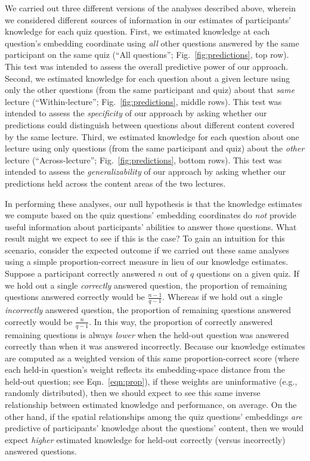 \documentclass[10pt]{article}
\begin{document}
We carried out three different versions of the analyses described above,
wherein we considered different sources of information in our estimates of
participants' knowledge for each quiz question. First, we estimated knowledge
at each question's embedding coordinate using \textit{all} other questions
answered by the same participant on the same quiz (``All questions'';
Fig.~\ref{fig:predictions}, top row). This test was intended to assess the
overall predictive power of our approach. Second, we estimated knowledge for
each question about a given lecture using only the other questions (from the
same participant and quiz) about that \textit{same} lecture
(``Within-lecture''; Fig.~\ref{fig:predictions}, middle rows). This test was
intended to assess the \textit{specificity} of our approach by asking whether
our predictions could distinguish between questions about different content
covered by the same lecture. Third, we estimated knowledge for each question
about one lecture using only questions (from the same participant and quiz)
about the \textit{other} lecture (``Across-lecture'';
Fig.~\ref{fig:predictions}, bottom rows). This test was intended to assess the
\textit{generalizability} of our approach by asking whether our predictions
held across the content areas of the two lectures.

In performing these analyses, our null hypothesis is that the knowledge
estimates we compute based on the quiz questions' embedding coordinates do
\textit{not} provide useful information about participants' abilities to answer
those questions. What result might we expect to see if this is the case? To
gain an intuition for this scenario, consider the expected outcome if we
carried out these same analyses using a simple proportion-correct measure in
lieu of our knowledge estimates. Suppose a participant correctly answered $n$
out of $q$ questions on a given quiz. If we hold out a single
\textit{correctly} answered question, the proportion of remaining questions
answered correctly would be $\frac{n - 1}{q - 1}$. Whereas if we hold out a
single \textit{incorrectly} answered question, the proportion of remaining
questions answered correctly would be $\frac{n}{q - 1}$. In this way, the
proportion of correctly answered remaining questions is always \textit{lower}
when the held-out question was answered correctly than when it was answered
incorrectly. Because our knowledge estimates are computed as a weighted version
of this same proportion-correct score (where each held-in question's weight
reflects its embedding-space distance from the held-out question; see
Eqn.~\ref{eqn:prop}), if these weights are uninformative (e.g., randomly
distributed), then we should expect to see this same inverse relationship
between estimated knowledge and performance, on average. On the other hand, if
the spatial relationships among the quiz questions' embeddings \textit{are}
predictive of participants' knowledge about the questions' content, then we
would expect \textit{higher} estimated knowledge for held-out correctly (versus
incorrectly) answered questions.
\end{document}
